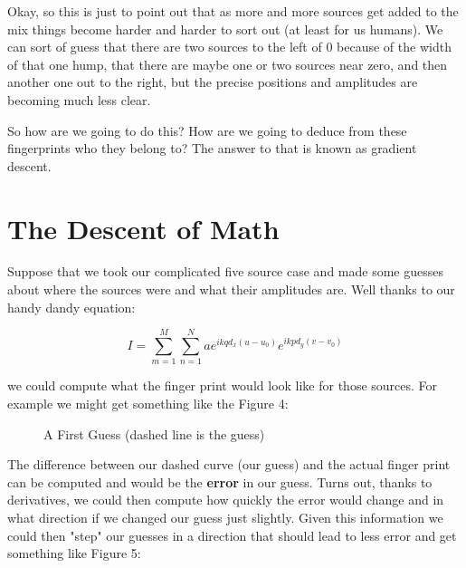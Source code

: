 \documentclass[12pt,a6paper]{book}
\begin{document}
Okay, so this is just to point out that as more and more sources get added to the mix things become harder and harder to sort out (at least for us humans). We can sort of guess that there are two sources to the left of 0 because of the width of that one hump, that there are maybe one or two sources near zero, and then another one out to the right, but the precise positions and amplitudes are becoming much less clear. 

So how are we going to do this? How are we going to deduce from these fingerprints who they belong to? The answer to that is known as gradient descent. 

\section{The Descent of Math}
Suppose that we took our complicated five source case and made some guesses about where the sources were and what their amplitudes are. Well thanks to our handy dandy equation:

\begin{equation}
I=\sum_{m=1}^M \sum_{n=1}^N  ae^{ikqd_x(u-u_0)}e^{ikpd_y(v-v_0)}
\end{equation}

we could compute what the finger print would look like for those sources. For example we might get something like the Figure 4:

\begin{figure}[!htb]
\caption{\label{fig:my-label} A First Guess (dashed line is the guess)}
\end{figure}

The difference between our dashed curve (our guess) and the actual finger print can be computed and would be the \textbf{error} in our guess. Turns out, thanks to derivatives, we could then compute how quickly the error would change and in what direction if we changed our guess just slightly. Given this information we could then "step" our guesses in a direction that should lead to less error and get something like Figure 5: 
\end{document}
